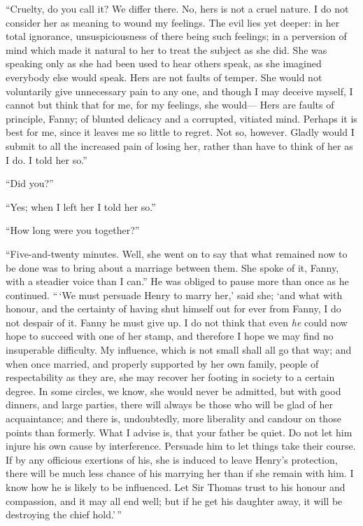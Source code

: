 ``Cruelty, do you call it?  We differ there.  No, hers is
not a cruel nature.  I do not consider her as meaning
to wound my feelings.  The evil lies yet deeper:
in her total ignorance, unsuspiciousness of there being
such feelings; in a perversion of mind which made it
natural to her to treat the subject as she did.  She was
speaking only as she had been used to hear others speak,
as she imagined everybody else would speak.  Hers are
not faults of temper.  She would not voluntarily give
unnecessary pain to any one, and though I may deceive myself,
I cannot but think that for me, for my feelings, she would---%
Hers are faults of principle, Fanny; of blunted delicacy
and a corrupted, vitiated mind.  Perhaps it is best for me,
since it leaves me so little to regret.  Not so, however.
Gladly would I submit to all the increased pain of
losing her, rather than have to think of her as I do.
I told her so.''

``Did you?''

``Yes; when I left her I told her so.''

``How long were you together?''

``Five-and-twenty minutes.  Well, she went on to say that
what remained now to be done was to bring about a marriage
between them.  She spoke of it, Fanny, with a steadier
voice than I can.''  He was obliged to pause more than once
as he continued.  ``\,`We must persuade Henry to marry her,'
said she; `and what with honour, and the certainty of having
shut himself out for ever from Fanny, I do not despair
of it.  Fanny he must give up.  I do not think that even
\emph{he} could now hope to succeed with one of her stamp,
and therefore I hope we may find no insuperable difficulty.
My influence, which is not small shall all go that way;
and when once married, and properly supported by her
own family, people of respectability as they are, she may
recover her footing in society to a certain degree.
In some circles, we know, she would never be admitted,
but with good dinners, and large parties, there will
always be those who will be glad of her acquaintance;
and there is, undoubtedly, more liberality and candour
on those points than formerly.  What I advise is,
that your father be quiet.  Do not let him injure his own
cause by interference.  Persuade him to let things take
their course.  If by any officious exertions of his,
she is induced to leave Henry's protection, there will be
much less chance of his marrying her than if she remain
with him.  I know how he is likely to be influenced.
Let Sir Thomas trust to his honour and compassion, and it
may all end well; but if he get his daughter away, it will
be destroying the chief hold.'\,''


